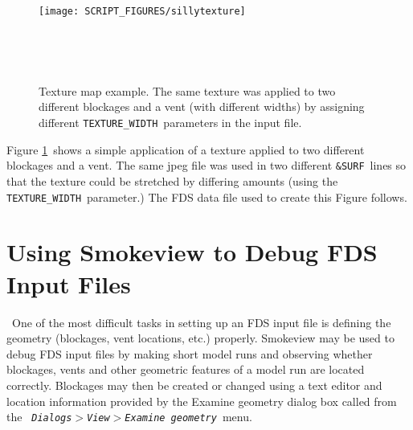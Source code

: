\documentclass[11pt,twoside]{book}
\begin{document}
\begin{figure}[bph]
\centerline{\texttt{[image: SCRIPT\_FIGURES/sillytexture]}
}\ \caption [Texture map example.] {
Texture map example.  The same texture was applied to two different
blockages and a vent (with different widths) by assigning different {\tt TEXTURE\_WIDTH}\
parameters in the input file.
}\ \label{figTextures}
\end{figure}
Figure \ref{figTextures}\ shows a simple application of a texture
applied to two different blockages and a vent.  The same jpeg file
was used in two different {\tt \&SURF}\ lines so that the texture
could be stretched by differing amounts (using the {\tt
TEXTURE\_WIDTH}\ parameter.)  The FDS data file used to create
this Figure follows.



\chapter{Using Smokeview to Debug FDS Input Files}\ One of the most difficult
tasks in setting up an FDS input file is defining the geometry
(blockages, vent locations, etc.) properly. Smokeview may be used
to debug FDS input files by making short model runs and observing
whether blockages, vents and other geometric features of a model
run are located correctly. Blockages may then be created or
changed using a text editor and location information provided by
the Examine geometry dialog box called from the {\em \tt
Dialogs$>$View$>$Examine geometry}\ menu.
\end{document}
